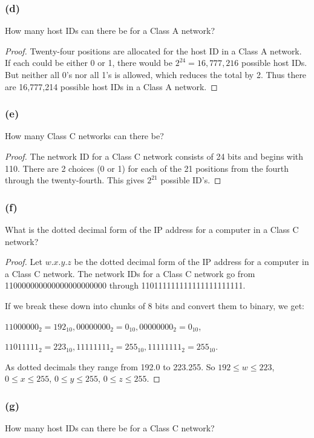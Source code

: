 \documentclass[14pt]{extarticle}
\begin{document}
\subsubsection{(d)}
How many host IDs can there be for a Class A network?

\begin{proof}
Twenty-four positions are allocated for the host ID in a Class A network. If each could be either 0 or 1, there 
would be \(2^{24} = 16,777,216\) possible host IDs. But neither all 0’s nor all 1’s is allowed, which reduces the 
total by 2. Thus there are 16,777,214 possible host IDs in a Class A network.
\end{proof}

\subsubsection{(e)}
How many Class C networks can there be?

\begin{proof}
The network ID for a Class C network consists of 24 bits and begins with 110. There are 2 choices (0 or 1) for each 
of the 21 positions from the fourth through the twenty-fourth. This gives \(2^{21}\) possible ID’s. 
\end{proof}

\subsubsection{(f)}
What is the dotted decimal form of the IP address for a computer in a Class C network?

\begin{proof}
Let \(w.x.y.z\) be the dotted decimal form of the IP address for a computer in a Class C network. The 
network IDs for a Class C network go from 110000000000000000000000 through 110111111111111111111111.

If we break these down into chunks of 8 bits and convert them to binary, we get:

\(11000000_2 = 192_{10}, 00000000_2 = 0_{10}, 00000000_2 = 0_{10}\),

\(11011111_2 = 223_{10}, 11111111_2 = 255_{10}, 11111111_2 = 255_{10}\).

As dotted decimals they range from 192.0 to 223.255. So \(192 \leq w \leq 223\), \(0 \leq x \leq 255\), 
\(0 \leq y \leq 255\), \(0 \leq z \leq 255\).
\end{proof}

\subsubsection{(g)}
How many host IDs can there be for a Class C network?
\end{document}

